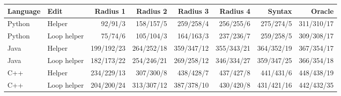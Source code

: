 \begin{tabular}{@{}llrrrrrr@{}}
\toprule
Language & Edit & Radius 1 & Radius 2 & Radius 3 & Radius 4 & Syntax & Oracle \\
\midrule
Python & Helper & 92/91/3 & 158/157/5 & 259/258/4 & 256/255/6 & 275/274/5 & 311/310/17 \\
Python & Loop helper & 75/74/6 & 105/104/3 & 164/163/3 & 237/236/7 & 259/258/5 & 309/308/17 \\
Java & Helper & 199/192/23 & 264/252/18 & 359/347/12 & 355/343/21 & 364/352/19 & 367/354/17 \\
Java & Loop helper & 182/173/22 & 254/246/21 & 269/258/12 & 346/334/27 & 359/347/25 & 366/354/18 \\
C++ & Helper & 234/229/13 & 307/300/8 & 438/428/7 & 437/427/8 & 441/431/6 & 448/438/19 \\
C++ & Loop helper & 204/200/24 & 313/307/12 & 387/378/10 & 430/420/8 & 431/421/16 & 442/432/35 \\
\bottomrule
\end{tabular}

